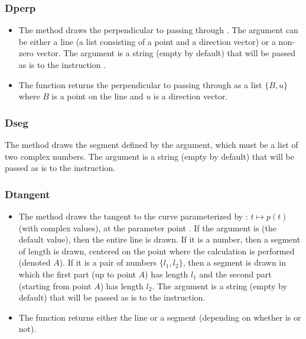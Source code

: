 \subsubsection{Dperp}
\begin{itemize}
    \item The method  draws the perpendicular to  passing through . The argument  can be either a line (a list consisting of a point and a direction vector) or a non-zero vector. The argument  is a string (empty by default) that will be passed as is to the instruction \drawcmd. \arguScale
    
    \item The function  returns the perpendicular to  passing through  as a list $\{B,u\}$ where $B$ is a point on the line and $u$ is a direction vector.
\end{itemize}

\subsubsection{Dseg}
The  method draws the segment defined by the  argument, which must be a list of two complex numbers. The  argument is a string (empty by default) that will be passed as is to the \drawcmd instruction. \arguScale

\newcommand*{\arguLong}{%
If the argument \argu{length} is \nil (the default value), then the entire line is drawn. If it is a number, then a segment of length \argu{length} is drawn, centered on the point where the calculation is performed (denoted $A$). If it is a pair of numbers $\{l_1, l_2\}$, then a segment is drawn in which the first part (up to point $A$) has length $l_1$ and the second part (starting from point $A$) has length $l_2$.
}%

\subsubsection{Dtangent}
\begin{itemize}
    \item The  method draws the tangent to the curve parameterized by : \(t \mapsto p(t)\) (with complex values), at the parameter point . \arguLong{} The argument  is a string (empty by default) that will be passed as is to the \drawcmd instruction.
    \item The function  returns either the line or a segment (depending on whether  is \nil or not).
\end{itemize}

